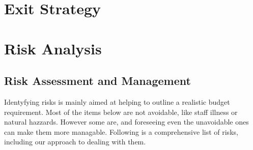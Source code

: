 \documentclass[11pt]{article}
\begin{document}
\section{Exit Strategy}

\newpage
\section{Risk Analysis}

  \subsection{Risk Assessment and Management}
  Identyfying risks is mainly aimed at helping to outline a realistic budget requirement. Most of the items below are not avoidable, like staff illness or natural hazzards. However some are, and foreseeing even the unavoidable ones can make them more managable. Following is a comprehensive list of risks, including our approach to dealing with them.
\newpage
\end{document}

